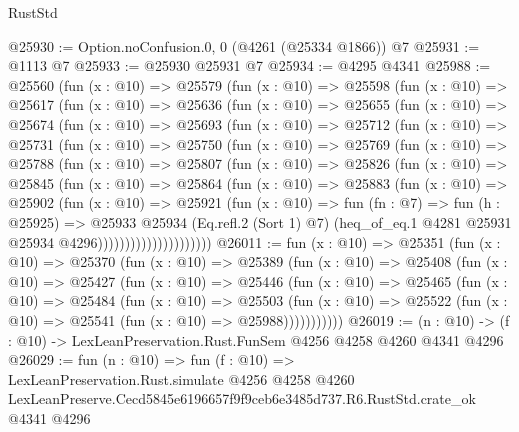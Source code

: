 \begin{lexlean}{RustStd}
\begin{coremodule}
@25930 := Option.noConfusion.{0, 0} (@4261 (@25334 @1866)) @7
@25931 := @1113 @7
@25933 := @25930 @25931 @7
@25934 := @4295 @4341
@25988 := @25560
    (fun (x : @10) =>
    @25579
      (fun (x : @10) =>
      @25598
        (fun (x : @10) =>
        @25617
          (fun (x : @10) =>
          @25636
            (fun (x : @10) =>
            @25655
              (fun (x : @10) =>
              @25674
                (fun (x : @10) =>
                @25693
                  (fun (x : @10) =>
                  @25712
                    (fun (x : @10) =>
                    @25731
                      (fun (x : @10) =>
                      @25750
                        (fun (x : @10) =>
                        @25769
                          (fun (x : @10) =>
                          @25788
                            (fun (x : @10) =>
                            @25807
                              (fun (x : @10) =>
                              @25826
                                (fun (x : @10) =>
                                @25845
                                  (fun (x : @10) =>
                                  @25864
                                    (fun (x : @10) =>
                                    @25883
                                      (fun (x : @10) =>
                                      @25902
                                        (fun (x : @10) =>
                                        @25921
                                          (fun (x : @10) =>
                                          fun (fn : @7) =>
                                          fun (h : @25925) =>
                                          @25933
                                            @25934
                                            (Eq.refl.{2} (Sort 1) @7)
                                            (heq_of_eq.{1}
                                              @4281
                                              @25931
                                              @25934
                                              @4296)))))))))))))))))))))
@26011 := fun (x : @10) =>
  @25351
    (fun (x : @10) =>
    @25370
      (fun (x : @10) =>
      @25389
        (fun (x : @10) =>
        @25408
          (fun (x : @10) =>
          @25427
            (fun (x : @10) =>
            @25446
              (fun (x : @10) =>
              @25465
                (fun (x : @10) =>
                @25484
                  (fun (x : @10) =>
                  @25503
                    (fun (x : @10) =>
                    @25522 (fun (x : @10) => @25541 (fun (x : @10) => @25988)))))))))))
@26019 := (n : @10) -> (f : @10) -> LexLeanPreservation.Rust.FunSem @4256 @4258 @4260 @4341 @4296
@26029 := fun (n : @10) =>
  fun (f : @10) =>
  LexLeanPreservation.Rust.simulate
    @4256
    @4258
    @4260
    LexLeanPreserve.Cecd5845e6196657f9f9ceb6e3485d737.R6.RustStd.crate_ok
    @4341
    @4296
\end{coremodule}
\end{lexlean}
